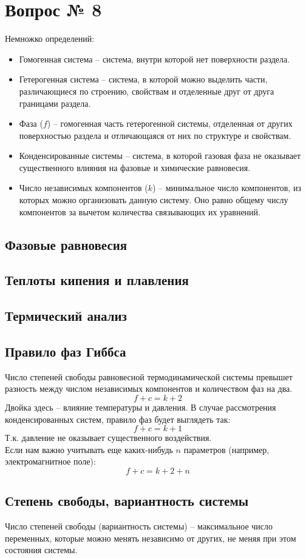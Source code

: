 \documentclass[14pt,a4paper]{scrartcl}
\begin{document}
\section*{Вопрос № 8}
Немножко определений:
\begin{itemize}
	\item Гомогенная система -- система, внутри которой нет поверхности раздела.
	\item Гетерогенная система -- система, в которой можно выделить части, различающиеся по строению, свойствам и отделенные друг от друга границами раздела.
	\item Фаза ($f$) -- гомогенная часть гетерогенной системы, отделенная от других поверхностью раздела и отличающаяся от них по структуре и свойствам.
	\item Конденсированные системы -- система, в которой газовая фаза не оказывает существенного влияния на фазовые и химические равновесия.
	\item Число независимых компонентов ($k$) -- минимальное число компонентов, из которых можно организовать данную систему. Оно равно общему числу компонентов за вычетом количества связывающих их уравнений.
\end{itemize}
\subsection*{Фазовые равновесия}
\subsection*{Теплоты кипения и плавления}
\subsection*{Термический анализ}
\subsection*{Правило фаз Гиббса}
Число степеней свободы равновесной термодинамической системы превышет разность между числом независимых компонентов и количеством фаз на два.
$$ f+c = k+2 $$
Двойка здесь -- влияние температуры и давления. В случае рассмотрения конденсированных систем, правило фаз будет выглядеть так:
$$ f+c = k+1 $$
Т.к. давление не оказывает существенного воздействия. \\
Если нам важно учитывать еще каких-нибудь $n$ параметров (например, электромагнитное поле):
$$ f+c = k+2 + n $$

\subsection*{Степень свободы, вариантность системы}
Число степеней свободы (вариантность системы) -- максимальное число переменных, которые можно менять независимо от других, не меняя при этом состояния системы.
\end{document}
